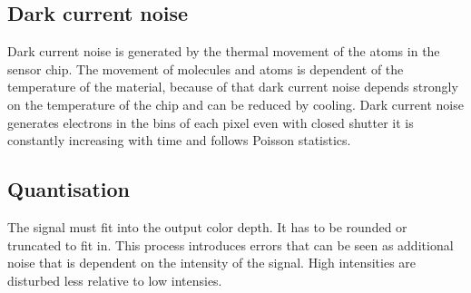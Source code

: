 \subsection{Dark current noise}
Dark current noise is generated by the thermal movement of the atoms in the sensor chip. The movement of molecules and atoms is dependent of the temperature of the material, because of that dark current noise depends strongly on the temperature of the chip and can be reduced by cooling. Dark current noise generates electrons in the bins of each pixel even with closed shutter it is constantly increasing with time and follows Poisson statistics.
\subsection{Quantisation}
The signal must fit into the output color depth. It has to be rounded or truncated to fit in. This process introduces errors that can be seen as additional noise that is dependent on the intensity of the signal. High intensities are disturbed less relative to low intensies.
